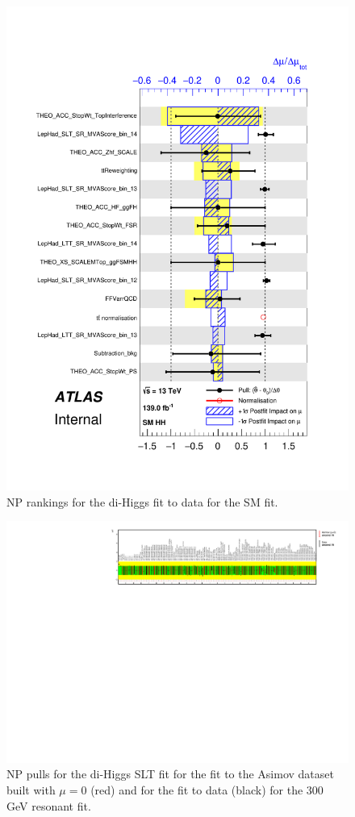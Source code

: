    \begin{figure}
   \centering
   \includegraphics[width=.8\textwidth]{figures/results/HH/LepHad/pulls_SigXsecOverSM_125.pdf}
   \caption{NP rankings for the di-Higgs \lephad fit to data for the SM fit.}
   \label{fig:LepHadPostfitNPRankingsSM}
   \end{figure}

\begin{figure}
\centering
\includegraphics[angle=270]{figures/results/HH/LepHad/NP_allExceptGammas_2HDM300_SLT.pdf}
\caption{NP pulls for the di-Higgs \lephad SLT fit for the fit to the Asimov dataset built with $\mu=0$ (red) and for the fit to data (black) for the 300 GeV resonant fit.}
\label{fig:LepHadPostfitNPPulls2HDM300SLT}
\end{figure}


